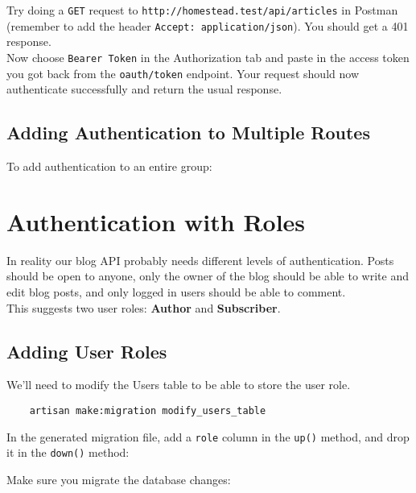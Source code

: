 
Try doing a \texttt{GET} request to \texttt{http://homestead.test/api/articles} in Postman (remember to add the header \texttt{Accept: application/json}). You should get a 401 response.
\\

Now choose \texttt{Bearer Token} in the Authorization tab and paste in the access token you got back from the \texttt{oauth/token} endpoint. Your request should now authenticate successfully and return the usual response.

\subsection{Adding Authentication to Multiple Routes}

To add authentication to an entire group:




\section{Authentication with Roles}

In reality our blog API probably needs different levels of authentication. Posts should be open to anyone, only the owner of the blog should be able to write and edit blog posts, and only logged in users should be able to comment.
\\

This suggests two user roles: \textbf{Author} and \textbf{Subscriber}.


\subsection{Adding User Roles}

We'll need to modify the Users table to be able to store the user role.

\begin{verbatim}
    artisan make:migration modify_users_table
\end{verbatim}

In the generated migration file, add a \texttt{role} column in the \texttt{up()} method, and drop it in the \texttt{down()} method:


Make sure you migrate the database changes:

